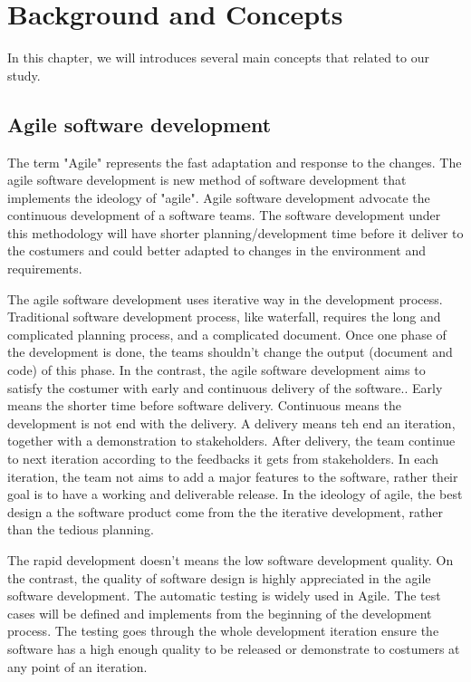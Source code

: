 \chapter{Background and Concepts}
In this chapter, we will introduces several main concepts that related to our study.
\section{Agile software development}
\label{agile}
The term "Agile" represents the fast adaptation and response to the changes.\cite{WhatisAg98:online}
The agile software development is new method of software development that implements the ideology of "agile". Agile software development advocate the continuous development of a software teams. The software development under this methodology will have shorter planning/development time before it deliver to the costumers and could better adapted to changes in the environment and requirements.
\par
The agile software development uses iterative way in the development process. Traditional software development process, like waterfall, requires the long and complicated planning process, and a complicated document. Once one phase of the development is done, the teams shouldn't change the output (document and code) of this phase.\cite{cusumano1995beyond} In the contrast, the agile software development aims to satisfy the costumer with early and continuous delivery of the software.\cite{beck2001manifesto}. Early means the shorter time before software delivery. Continuous means the development is not end with the delivery. A delivery means teh end an iteration, together with a demonstration to stakeholders. After delivery, the team continue to next iteration according to the feedbacks it gets from stakeholders. In each iteration, the team not aims to add a major features to the software, rather their goal is to have a working and deliverable release\cite{beck1999embracing}. In the ideology of agile, the best design a the software product come from the the iterative development, rather than the tedious planning.\cite{beck2001manifesto}
\par
The rapid development doesn't means the low software development quality. On the contrast, the quality of software design is highly appreciated in the agile software development. The automatic testing is widely used in Agile. The test cases will be defined and implements from the beginning of the development process. The testing goes through the whole development iteration ensure the software has a high enough quality to be released or demonstrate to costumers at any point of an iteration\cite{Agilesof32:online}.
